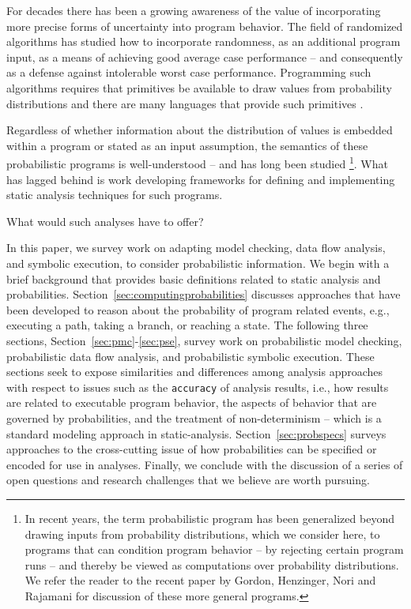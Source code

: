 For decades there has been a growing awareness of the value of 
incorporating more precise forms of uncertainty into program behavior.  
The field of randomized algorithms has studied how to incorporate
randomness, as an additional program input, as a means of achieving
good average case performance -- and consequently as a defense against
intolerable worst case performance.
Programming such algorithms requires that primitives be available
to draw values from probability distributions and there are many
languages that provide such primitives \cite{NetLogo,others}.  

Regardless of whether information about the distribution of
values is embedded within a program or stated as an input assumption,
the semantics of these probabilistic programs is well-understood --
and has long been studied \cite{kozen1981semantics,others}
\footnote{In recent
years, the term probabilistic program has been generalized beyond
drawing inputs from probability distributions, which we
consider here, to programs that can condition program behavior -- by
rejecting certain program runs -- and thereby be viewed as
computations over probability distributions.  We refer the reader to the
recent paper by Gordon, Henzinger, Nori and Rajamani \cite{Gordon2014}
for discussion of these more general programs.}. 
What has lagged behind is work developing frameworks for 
defining and implementing static analysis techniques for such programs.

What would such analyses have to offer?

In this paper, we survey work on adapting model checking, data flow analysis, 
and symbolic execution, to consider probabilistic information.
We begin with a brief background that provides basic definitions
related to static analysis and probabilities.
Section~\ref{sec:computingprobabilities} discusses approaches that
have been developed to reason about the probability of program
related events, e.g., executing a path, taking a branch, or reaching a state.
The following three sections, 
Section~\ref{sec:pmc}-\ref{sec:pse}, survey work on probabilistic
model checking, probabilistic data flow analysis, and probabilistic
symbolic execution.  These sections seek to expose similarities
and differences among analysis approaches with respect to issues
such as the \texttt{accuracy} of analysis results, i.e., how results
are related to executable program behavior, 
the aspects of behavior that are governed by probabilities, and
the treatment of non-determinism -- which is a standard modeling
approach in static-analysis.
Section~\ref{sec:probspecs} surveys approaches to the cross-cutting
issue of how probabilities can be specified or encoded for use
in analyses.
Finally, we conclude with the discussion of a series of open questions
and research challenges that we believe are worth pursuing.

